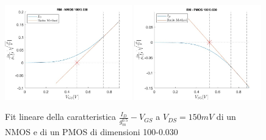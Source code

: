 \documentclass[
	a4paper,
	cleardoublepage=empty,
	headings=twolinechapter,
	numbers=autoenddot,
]{scrbook}
\begin{document}
\begin{figure}[h!]
  \centering
  \includegraphics[width=0.49\textwidth]{RM-N4-100-30}
  \includegraphics[width=0.49\textwidth]{RM-P1-100-30}
  \caption{Fit lineare della caratteristica $\frac{I_D}{g_m^{0.5}}-V_{GS}$ a $V_{DS}=150mV$ di un NMOS e di un PMOS di dimensioni 100-0.030}
\end{figure}
\end{document}
